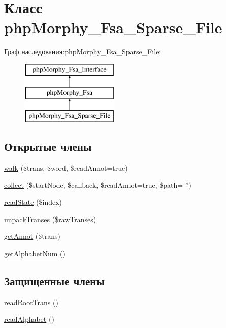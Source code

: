 \hypertarget{classphpMorphy__Fsa__Sparse__File}{
\section{Класс phpMorphy\_\-Fsa\_\-Sparse\_\-File}
\label{classphpMorphy__Fsa__Sparse__File}
}
Граф наследования:phpMorphy\_\-Fsa\_\-Sparse\_\-File:\begin{figure}[H]
\begin{center}
\leavevmode
\includegraphics[height=3.000000cm]{classphpMorphy__Fsa__Sparse__File}
\end{center}
\end{figure}
\subsection*{Открытые члены}
\begin{DoxyCompactItemize}
\item 
\hyperlink{classphpMorphy__Fsa__Sparse__File_a4995b3f44bde356009c67df7afed2c5a}{walk} (\$trans, \$word, \$readAnnot=true)
\item 
\hyperlink{classphpMorphy__Fsa__Sparse__File_a37a37dd510ab3f09abc80d6a47d0c3bf}{collect} (\$startNode, \$callback, \$readAnnot=true, \$path= '')
\item 
\hyperlink{classphpMorphy__Fsa__Sparse__File_ad1d78bc2f34f2bf0b1c68505338fed8b}{readState} (\$index)
\item 
\hyperlink{classphpMorphy__Fsa__Sparse__File_a8dda9eff14caf996d36462778649c523}{unpackTranses} (\$rawTranses)
\item 
\hyperlink{classphpMorphy__Fsa__Sparse__File_aa87d98ae42ddbb3bc70c0fdaf938a927}{getAnnot} (\$trans)
\item 
\hyperlink{classphpMorphy__Fsa__Sparse__File_aa8970309717fde993db5dce66ecd390e}{getAlphabetNum} ()
\end{DoxyCompactItemize}
\subsection*{Защищенные члены}
\begin{DoxyCompactItemize}
\item 
\hyperlink{classphpMorphy__Fsa__Sparse__File_a069b3e5c1ca0ba25d9e495f12154aef6}{readRootTrans} ()
\item 
\hyperlink{classphpMorphy__Fsa__Sparse__File_a905a828550de9b4da7e47df777d994ef}{readAlphabet} ()
\end{DoxyCompactItemize}
